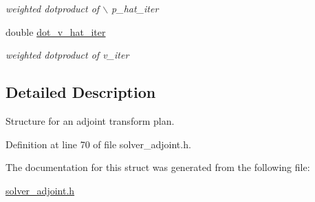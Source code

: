 \begin{CompactItemize}
\begin{CompactList}\small\item\em weighted dotproduct of $\backslash$ p\_\-hat\_\-iter \item\end{CompactList}\item 
\hypertarget{structinfst__adjoint__plan_o17}{
double \hyperlink{structinfst__adjoint__plan_o17}{dot\_\-v\_\-hat\_\-iter}}
\label{structinfst__adjoint__plan_o17}

\begin{CompactList}\small\item\em weighted dotproduct of v\_\-iter \item\end{CompactList}\end{CompactItemize}


\subsection{Detailed Description}
Structure for an adjoint transform plan. 



Definition at line 70 of file solver\_\-adjoint.h.

The documentation for this struct was generated from the following file:\begin{CompactItemize}
\item 
\hyperlink{solver__adjoint_8h}{solver\_\-adjoint.h}\end{CompactItemize}
